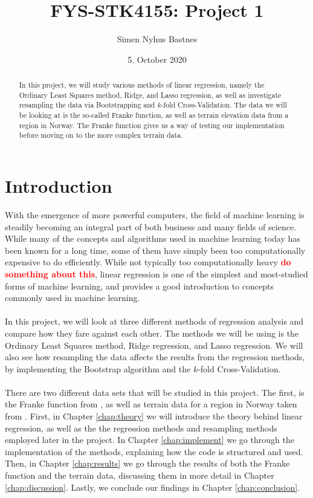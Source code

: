 \documentclass{article}
\title{FYS-STK4155: Project 1}
\author{Simen Nyhus Bastnes}
\date{5. October 2020}
\newcommand\red[1]{\textcolor{red}{\textbf{#1}}}
\begin{document}
\maketitle
\begin{abstract}
In this project, we will study various methods of linear regression, namely the Ordinary Least Squares method, Ridge, and Lasso regression, as well as investigate resampling the data via Bootstrapping and $k$-fold Cross-Validation. The data we will be looking at is the so-called Franke function, as well as terrain elevation data from a region in Norway. The Franke function gives us a way of testing our implementation before moving on to the more complex terrain data.%
\end{abstract}

\section{Introduction}

With the emergence of more powerful computers, the field of machine learning is steadily becoming an integral part of both business and many fields of science. While many of the concepts and algorithms used in machine learning today has been known for a long time, some of them have simply been too computationally expensive to do efficiently. While not typically too computationally heavy \red{do something about this}, linear regression is one of the simplest and most-studied forms of machine learning, and provides a good introduction to concepts commonly used in machine learning. 
\\\\
In this project, we will look at three different methods of regression analysis and compare how they fare against each other. The methods we will be using is the Ordinary Least Squares method, Ridge regression, and Lasso regression. We will also see how resampling the data affects the results from the regression methods, by implementing the Bootstrap algorithm and the $k$-fold Cross-Validation.
\\\\
There are two different data sets that will be studied in this project. The first, is the Franke function from \cite{Franke}, as well as terrain data for a region in Norway taken from \cite{terrain}. First, in Chapter \ref{chap:theory} we will introduce the theory behind linear regression, as well as the the regression methods and resampling methods employed later in the project. In Chapter \ref{chap:implement} we go through the implementation of the methods, explaining how the code is structured and used. Then, in Chapter \ref{chap:results} we go through the results of both the Franke function and the terrain data, discussing them in more detail in Chapter \ref{chap:discussion}. Lastly, we conclude our findings in Chapter \ref{chap:conclusion}.
\end{document}
